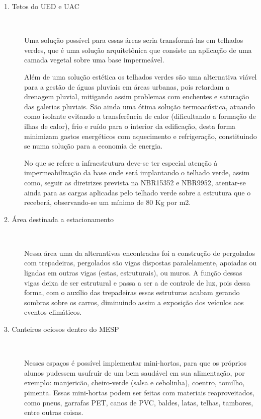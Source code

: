   \begin{description}
    \item[1. Tetos do UED e UAC] \

      Uma solução possível para essas áreas seria transformá-las em telhados verdes, que é uma solução arquitet\^{o}nica que consiste na
      aplicação de uma camada vegetal sobre uma base impermeável.

      Além de uma solução estética os telhados verdes são uma alternativa viável para a gestão de águas pluviais em áreas urbanas, pois
      retardam a drenagem pluvial, mitigando assim problemas com enchentes e saturação das galerias pluviais. São ainda uma ótima solução
      termoacústica, atuando como isolante evitando a transferência de calor (dificultando a formação de ilhas de calor), frio e ruído para
      o interior da edificação, desta forma minimizam gastos energéticos com aquecimento e refrigeração, constituindo se numa solução para
      a economia de energia.

      No que se refere a infraestrutura deve-se ter especial atenção à impermeabilização da base onde será implantando o telhado verde,
      assim como, seguir as diretrizes prevista na NBR15352 e NBR9952, atentar-se ainda para as cargas aplicadas pelo telhado verde sobre
      a estrutura que o receberá, observando-se um mínimo de 80 Kg por m2.

    \item[2. Área destinada a estacionamento] \

      Nessa área uma da alternativas encontradas foi a construção de pergolados com trepadeiras, pergolados são vigas dispostas paralelamente,
      apoiadas ou ligadas em outras vigas (estas, estruturais), ou muros. A função dessas vigas deixa de ser estrutural e passa a ser a de
      controle de luz, pois dessa forma, com o auxílio das trepadeiras essas estruturas acabam gerando sombras sobre os carros, diminuindo
      assim a exposição dos veículos aos eventos climáticos.

    \item[3. Canteiros ociosos dentro do MESP] \

      Nesses espaços é possível implementar mini-hortas, para que os próprios alunos pudessem usufruir de um bem saudável em sua
      alimentação, por exemplo: manjericão, cheiro-verde (salsa e cebolinha), coentro, tomilho, pimenta. Essas mini-hortas podem ser feitas
      com materiais reaproveitados, como pneus, garrafas PET, canos de PVC, baldes, latas, telhas, tambores, entre outras coisas.


\end{description}
